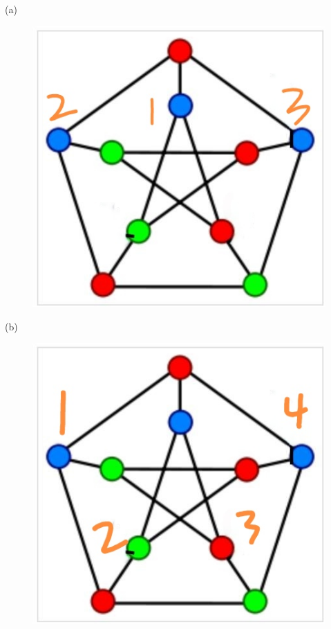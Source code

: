 \documentclass[a4paper, justified]{tufte-handout}
\begin{document}
\begin{solution}
  (a)\\
  \begin{figure}[htbp]
    \centering
    \includegraphics[width = 0.75\linewidth]{figs/d.jpg}
  \end{figure}

  \noindent(b)\\
  \newpage
  \begin{figure}[htbp]
    \centering
    \includegraphics[width = 0.75\linewidth]{figs/e.jpg}
  \end{figure}
\end{solution}

\begin{problem}[CZ 5.22]
\end{problem}
\end{document}
